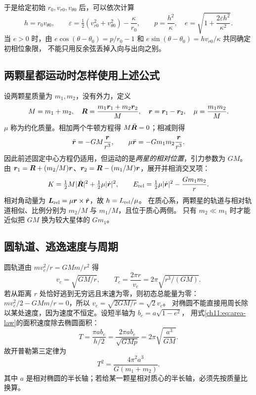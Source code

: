 于是给定初始 $r_0,v_{r0},v_{\theta0}$ 后，可以依次计算
\[
 h=r_0v_{\theta0},\qquad
 \varepsilon=\tfrac12(v_{r0}^2+v_{\theta0}^2)-\frac\kappa{r_0},\qquad
 p=\frac{h^2}{\kappa},\quad e=\sqrt{1+\frac{2\varepsilon h^2}{\kappa^2}}.
\]
当 $e>0$ 时，由
$e\cos(\theta-\theta_0)=p/r_0-1$ 和
$e\sin(\theta-\theta_0)=hv_{r0}/\kappa$ 共同确定初相位象限，
不能只用反余弦丢掉入向与出向之别。

\subsection{两颗星都运动时怎样使用上述公式}
设两颗星质量为 $m_1,m_2$，没有外力，定义
\[
 M=m_1+m_2,\quad
 \bm{R}=\frac{m_1\bm{r}_1+m_2\bm{r}_2}{M},\quad
 \bm{r}=\bm{r}_1-\bm{r}_2,\quad \mu=\frac{m_1m_2}{M}.
\]
$\mu$ 称为约化质量。相加两个牛顿方程得 $M\ddot{\bm{R}}=0$；相减则得
\[
 \ddot{\bm{r}}=-GM\frac{\bm{r}}{r^3},\qquad
 \mu\ddot{\bm{r}}=-Gm_1m_2\frac{\bm{r}}{r^3}.
\]
因此前述固定中心方程仍适用，但运动的是\emph{两星的相对位置}，引力参数为 $GM$。
由 $\bm{r}_1=\bm{R}+(m_2/M)\bm{r}$、$\bm{r}_2=\bm{R}-(m_1/M)\bm{r}$，展开并相消交叉项：
\[
 K=\tfrac12M|\dot{\bm{R}}|^2+\tfrac12\mu|\dot{\bm{r}}|^2,\qquad
 E_{\rm rel}=\tfrac12\mu|\dot{\bm{r}}|^2-\frac{Gm_1m_2}{r}.
\]
相对角动量为 $\bm{L}_{\rm rel}=\mu\bm{r}\times\dot{\bm{r}}$，故 $h=L_{\rm rel}/\mu$。
在质心系，两颗星的轨道与相对轨道相似、比例分别为 $m_2/M$ 与 $m_1/M$，且位于质心两侧。
只有 $m_2\ll m_1$ 时才能近似把 $GM$ 换为较大星体的 $Gm_1$。

\subsection{圆轨道、逃逸速度与周期}
圆轨道由 $mv_c^2/r=GMm/r^2$ 得
\[
 v_c=\sqrt{GM/r},\qquad T_c=\frac{2\pi r}{v_c}=2\pi\sqrt{r^3/(GM)}.
\]
若从距离 $r$ 处恰好逃到无穷远且末速为零，则初态总能量为零：
$mv_e^2/2-GMm/r=0$，所以 $v_e=\sqrt{2GM/r}=\sqrt2v_c$。
对椭圆不能直接用周长除以某处速度，因为速度不恒定。设短半轴为 $b_e=a\sqrt{1-e^2}$，
用式\eqref{ch11:eq:area-law}的面积速度除去椭圆面积：
\[
 T=\frac{\pi ab_e}{h/2}=\frac{2\pi ab_e}{\sqrt{GMp}}
 =2\pi\sqrt{\frac{a^3}{GM}}.
\]
故开普勒第三定律为
\begin{equation}\label{ch11:eq:third-law}
 \boxed{T^2=\frac{4\pi^2a^3}{G(m_1+m_2)}}.
\end{equation}
其中 $a$ 是相对椭圆的半长轴；若给某一颗星相对质心的半长轴，必须先按质量比换算。


